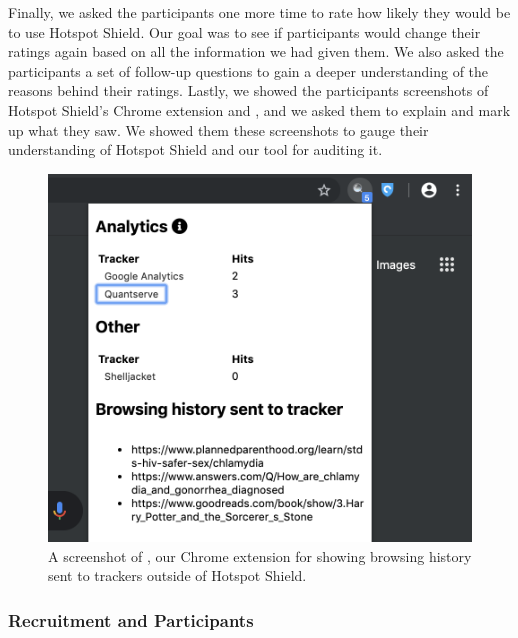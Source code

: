 Finally, we asked the participants one more time to rate how likely they would
be to use Hotspot Shield.  Our goal was to see if participants would change
their ratings again based on all the information we had given them.  We also
asked the participants a set of follow-up questions to gain a deeper
understanding of the reasons behind their ratings.  Lastly, we showed the
participants screenshots of Hotspot Shield's Chrome extension and \tool,
and we asked them to explain and mark up what they saw.  We showed them these
screenshots to gauge their understanding of Hotspot Shield and our tool for
auditing it.

\begin{figure}[t]
    \includegraphics[width=\linewidth]{sections/figures/vpn-audit.png}
    \caption{A screenshot of \tool, our Chrome extension for showing browsing history sent to trackers outside of Hotspot Shield.}
    \label{fig:vpn-audit}
\end{figure}

\subsubsection{Recruitment and Participants} 

